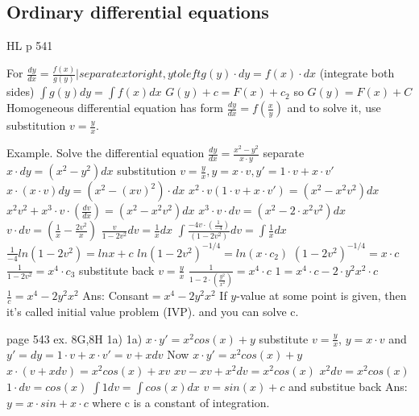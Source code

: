 \subsection{Ordinary differential equations}
HL p 541

For $\frac{dy}{dx}=\frac{f(x)}{g(y)} | separate x to right, y to left$$g(y)\cdot dy = f(x)\cdot dx$ (integrate both sides)
$\int g(y) dy=\int f(x) dx$
$G(y)+c = F(x) + c_2$
so $G(y)=F(x)+C$
Homogeneous differential equation has form $\frac{dy}{dx}=f(\frac{x}{y})$
and to solve it, use substitution $v=\frac{y}{x}$.

Example.
Solve the differential equation
$\frac{dy}{dx}=\frac{x^2-y^2}{x\cdot y}$ separate
$x\cdot dy=(x^2-y^2)dx$
substitution $v=\frac{y}{x},y=x\cdot v, y'=1\cdot v+x\cdot v'$
$x\cdot (x\cdot v)dy=(x^2-(xv)^2)\cdot dx$
$x^2\cdot v(1\cdot v+x\cdot v')=(x^2-x^2v^2)dx$
$x^2v^2+x^3\cdot v\cdot (\frac{dv}{dx})=(x^2-x^2v^2)dx$
$x^3\cdot v\cdot dv=(x^2-2\cdot x^2v^2)dx$ 
$v\cdot dv=(\frac{1}{x}-\frac{2v^2}{x})$
$\frac{v}{1-2v^2}dv=\frac{1}{x}dx$
$\int \frac{-4v\cdot(\frac{1}{-4})}{(1-2v^2)}dv=\int\frac{1}{x}dx$
$\frac{1}{-4}ln(1-2v^2)=ln x+c$
$ln(1-2v^2)^{-1/4}=ln(x\cdot c_2)$
$(1-2v^2)^{-1/4}=x\cdot c$
$\frac{1}{1-2v^2}=x^4\cdot c_3$
substitute back $v=\frac{y}{x}$
$\frac{1}{1-2\cdot (\frac{y^2}{x^2})}=x^4\cdot c$
$1=x^4\cdot c-2\cdot y^2x^2\cdot c$
$\frac{1}{c}=x^4-2y^2x^2$
Ans: Consant$=x^4-2y^2x^2$
If $y$-value at some point is given, then it's called initial value problem (IVP).
and you can solve c.

page 543 ex. 8G,8H 1a)
1a) $x\cdot y'=x^2cos(x)+y$
substitute $v=\frac{y}{x}$, $y=x\cdot v$
and $y'=dy=1\cdot v+x\cdot v'=v+xdv$
Now $x\cdot y'=x^2cos(x)+y$
$x\cdot (v+x dv)=x^2cos(x)+xv$
$xv-xv+x^2dv=x^2cos(x)$
$x^2dv=x^2cos(x)$
$1\cdot dv=cos(x)$
$\int 1 dv=\int cos(x) dx$
$v=sin(x)+c$ and substitue back
Ans: $y=x\cdot sin+x\cdot c$ where c is a constant of integration.

